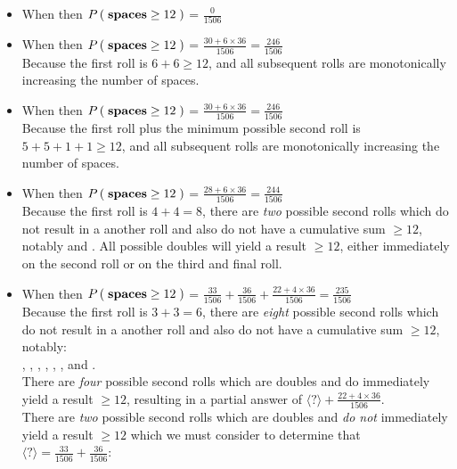 \documentclass{ProblemSetCUNY}
\newcommand{\Prob}[1]{\ensuremath{P\Parens{#1}}\xspace}
\begin{document}
\begin{itemize}
\item When  then \Prob{\textbf{spaces} \ge 12} = $\frac{0}{1506}$
\item When  then \Prob{\textbf{spaces} \ge 12} = $\frac{30 + 6 \times 36}{1506} = \frac{246}{1506}$\\
Because the first roll is $6 + 6 \ge 12$, and all subsequent rolls are monotonically increasing the number of spaces.
\item When  then \Prob{\textbf{spaces} \ge 12} = $\frac{30 + 6 \times 36}{1506} = \frac{246}{1506}$\\
Because the first roll plus the minimum possible second roll is $5 + 5 + 1 + 1 \ge 12$, and all subsequent rolls are monotonically increasing the number of spaces.
\item When  then \Prob{\textbf{spaces} \ge 12} = $\frac{28 + 6 \times 36}{1506} = \frac{244}{1506}$\\
Because the first roll is $4 + 4 = 8$, there are \emph{two} possible second rolls which do not result in a another roll and also do not have a cumulative sum $\ge 12$, notably  and . All possible doubles will yield a result $\ge 12$, either immediately on the second roll or on the third and final roll.
\item When  then \Prob{\textbf{spaces} \ge 12} = $\frac{33}{1506} + \frac{36}{1506} + \frac{22 + 4 \times 36}{1506} = \frac{235}{1506}$\\
Because the first roll is $3 + 3 = 6$, there are \emph{eight} possible second rolls which do not result in a another roll and also do not have a cumulative sum $\ge 12$, notably:\\
, , , , , ,  and .\\
There are \emph{four} possible second rolls which are doubles and do immediately yield a result $\ge 12$, resulting in a partial answer of $\langle?\rangle + \frac{22 + 4 \times 36}{1506}$.\\
There are \emph{two} possible second rolls which are doubles and \emph{do not} immediately yield a result $\ge 12$ which we must consider to determine that $\langle?\rangle = \frac{33}{1506} + \frac{36}{1506}$:

\end{itemize}
\end{document}
